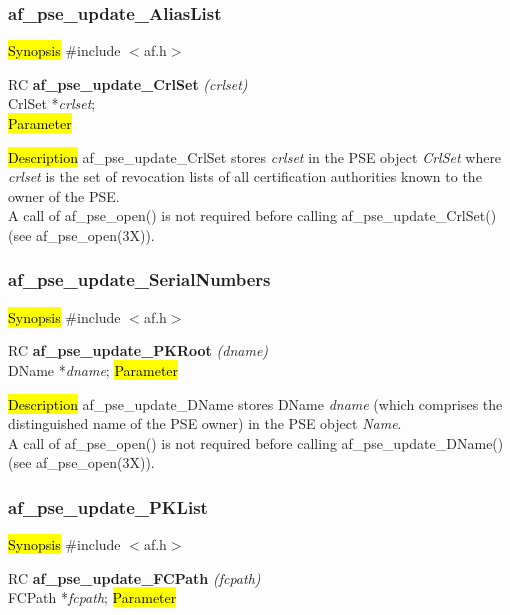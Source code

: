 \subsubsection{af\_pse\_update\_AliasList}
\label{af_update_CrlSet}
\hl{Synopsis}
\#include $<$af.h$>$

RC {\bf af\_pse\_update\_CrlSet} {\em (crlset)} \\
CrlSet *{\em crlset}; \\
\hl{Parameter}

\hl{Description}
af\_pse\_update\_CrlSet stores {\em crlset} in the PSE object {\em CrlSet} 
where {\em crlset} is the set of revocation lists of all certification authorities 
known to the owner of the PSE.
\\ [1em]
A call of af\_pse\_open() is not required before calling af\_pse\_update\_CrlSet()
(see af\_pse\_open(3X)).


\subsubsection{af\_pse\_update\_SerialNumbers}
\label{af_update_DName}
\hl{Synopsis}
\#include $<$af.h$>$ 

RC {\bf af\_pse\_update\_PKRoot} {\em (dname)} \\
DName *{\em dname};
\hl{Parameter}

\hl{Description}
af\_pse\_update\_DName stores DName {\em dname} (which comprises the distinguished name
of the PSE owner) in the PSE object {\em Name}.
\\ [1em]
A call of af\_pse\_open() is not required before calling af\_pse\_update\_DName()
(see af\_pse\_open(3X)).

\subsubsection{af\_pse\_update\_PKList}
\label{af_update_FCPath}
\hl{Synopsis}
\#include $<$af.h$>$ 

RC {\bf af\_pse\_update\_FCPath} {\em (fcpath)} \\
FCPath *{\em fcpath};
\hl{Parameter}

